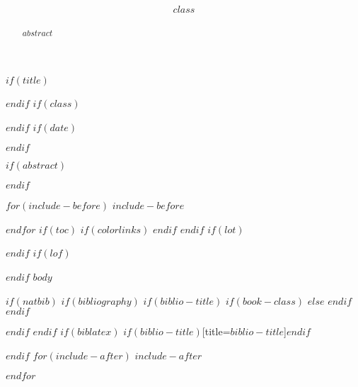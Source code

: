 \documentclass[11pt$if(landscape)$,landscape$endif$]{scrartcl}
\newcommand*{\TitleFont}{%
      \fontsize{14}{12}%
      \selectfont}
\newcommand*{\AuthFont}{%
      \fontsize{12}{12}%
      \selectfont}
\begin{document}
{\centering
  $if(title)$
  \title{\vspace{-4ex} \TitleFont{$title$}}
  $endif$
  $if(class)$
  \subtitle{$class$\vspace{-2ex}}
  $endif$
  $if(date)$
  \date{\vspace{-1.5ex} \AuthFont{$date$}\vspace{-4ex}}
  $endif$
  \author{\AuthFont{$name$}\vspace{-1.5ex}}
  \maketitle
}

$if(abstract)$
\begin{abstract}
$abstract$
\end{abstract}
$endif$

$for(include-before)$
$include-before$

$endfor$
$if(toc)$
{
$if(colorlinks)$
\hypersetup{linkcolor=$if(toccolor)$$toccolor$$else$black$endif$}
$endif$
\setcounter{tocdepth}{$toc-depth$}
\tableofcontents
}
$endif$
$if(lot)$
\listoftables
$endif$
$if(lof)$
\listoffigures
$endif$
$body$

$if(natbib)$
$if(bibliography)$
$if(biblio-title)$
$if(book-class)$
\renewcommand\bibname{$biblio-title$}
$else$
\renewcommand\refname{$biblio-title$}
$endif$
$endif$


$endif$
$endif$
$if(biblatex)$
\printbibliography$if(biblio-title)$[title=$biblio-title$]$endif$

$endif$
$for(include-after)$
$include-after$

$endfor$
\end{document}
